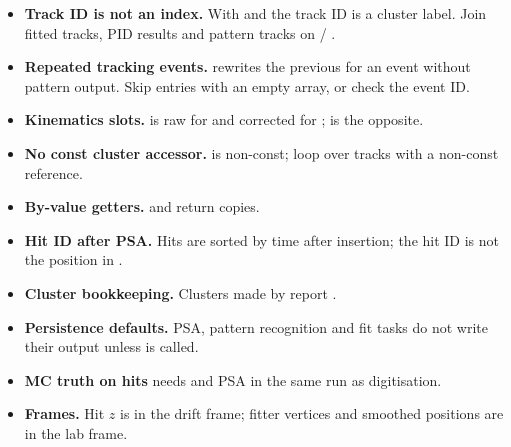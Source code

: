 \begin{itemize}
\item \textbf{Track ID is not an index.} With  and  the
  track ID is a cluster label. Join fitted tracks, PID results and pattern tracks on
   / .
\item \textbf{Repeated tracking events.}  rewrites the previous
   for an event without pattern output. Skip entries with an empty
   array, or check the event ID.
\item \textbf{Kinematics slots.}  is raw for  and corrected for
  ;  is the opposite.
\item \textbf{No const cluster accessor.}  is non-const; loop over
  tracks with a non-const reference.
\item \textbf{By-value getters.}  and 
  return copies.
\item \textbf{Hit ID after PSA.} Hits are sorted by time after insertion; the hit ID is not the position
  in .
\item \textbf{Cluster bookkeeping.} Clusters made by  report
  .
\item \textbf{Persistence defaults.} PSA, pattern recognition and fit tasks do not write their output
  unless  is called.
\item \textbf{MC truth on hits} needs  and PSA in the same run as digitisation.
\item \textbf{Frames.} Hit $z$ is in the drift frame; fitter vertices and smoothed positions are in the
  lab frame.
\end{itemize}
\endgroup
